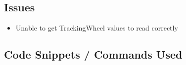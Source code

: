 \subsection*{Issues}
\begin{itemize}
    \item Unable to get TrackingWheel values to read correctly
\end{itemize}

\subsection*{Code Snippets / Commands Used}
\begin{lstlisting}
     
\end{lstlisting}


